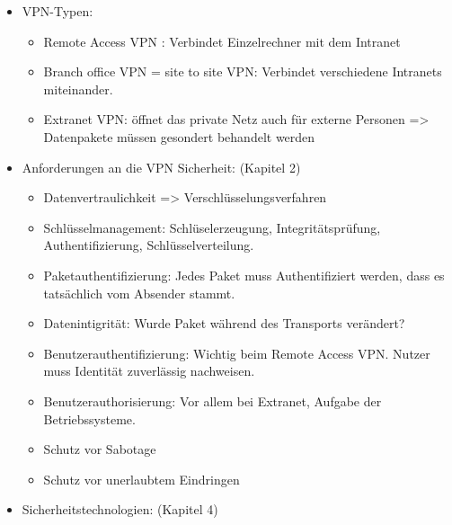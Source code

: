 \begin{itemize}
	\item VPN-Typen: \begin{itemize}	
					 \item Remote Access VPN : Verbindet Einzelrechner mit dem Intranet
					 \item Branch office VPN = site to site VPN: Verbindet verschiedene Intranets miteinander.
					 \item Extranet VPN: öffnet das private Netz auch für externe Personen => Datenpakete müssen gesondert behandelt werden
					 \end{itemize}	
   \item Anforderungen an die VPN Sicherheit: (Kapitel 2)
					\begin{itemize}
					\item Datenvertraulichkeit => Verschlüsselungsverfahren
					\item Schlüsselmanagement: Schlüselerzeugung, Integritätsprüfung, Authentifizierung, Schlüsselverteilung.
					\item Paketauthentifizierung: Jedes Paket muss Authentifiziert werden, dass es tatsächlich vom Absender stammt. 
					\item Datenintigrität: Wurde Paket während des Transports verändert?
					\item Benutzerauthentifizierung: Wichtig beim Remote Access VPN. Nutzer muss Identität zuverlässig nachweisen.
					\item Benutzerauthorisierung: Vor allem bei Extranet, Aufgabe der Betriebssysteme.
					\item Schutz vor Sabotage
					\item Schutz vor unerlaubtem Eindringen
					\end{itemize}
  \item Sicherheitstechnologien: (Kapitel 4)					
 
\end{itemize}
